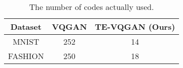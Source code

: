 \begin{table}[ht]
     \footnotesize
    \centering
    \caption{The number of codes actually used.%
    }
    \begin{tabular}{ccc}
         \hline
         Dataset & VQGAN & TE-VQGAN (Ours)  \\
         \hline
         MNIST   & 252 & 14 \\  %
         FASHION & 250 & 18  \\ %
         \hline
    \end{tabular}
    \label{tab:code_usage}
\end{table}